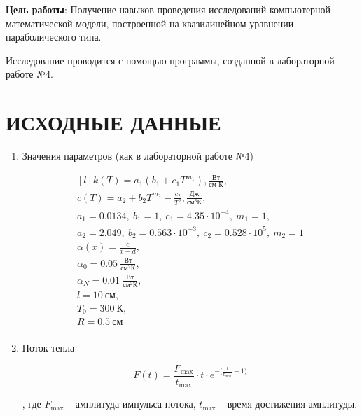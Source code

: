 \textbf{Цель работы}: Получение навыков проведения исследований компьютерной математической модели, построенной на квазилинейном уравнении параболического типа.

Исследование проводится с помощью программы, созданной в лабораторной работе №4.

\section{ИСХОДНЫЕ ДАННЫЕ}

\begin{enumerate}
    \item Значения параметров (как в лабораторной работе №4)

        \begin{equation*}
            \begin{matrix*}[l]
                k(T) = a_1(b_1 + c_1 T^{m_1}), \frac{\text{Вт}}{\text{см К}}, \\
                c(T) = a_2 + b_2 T^{m_2} - \frac{c_2}{T^2}, \frac{\text{Дж}}{\text{см}^3 \text{К}}, \\
                a_1 = 0.0134,\ b_1 = 1,\ c_1 = 4.35 \cdot 10^{-4},\ m_1=1, \\
                a_2 = 2.049,\ b_2 = 0.563 \cdot 10^{-3},\ c_2 = 0.528 \cdot 10^5,\ m_2 = 1 \\
                \alpha(x) = \frac{c}{x-d}, \\
                \alpha_0 = 0.05\ \frac{\text{Вт}}{\text{см}^2 \text{К}}, \\
                \alpha_N = 0.01\ \frac{\text{Вт}}{\text{см}^2 \text{К}}, \\
                l = 10\ \text{см}, \\
                T_0 = 300\ \text{К}, \\
                R = 0.5\ \text{см} \\
            \end{matrix*}
        \end{equation*}


    \item Поток тепла

        \begin{equation*}
            F(t) = \frac{F_\text{max}}{t_\text{max}} \cdot t \cdot e^{-\big(\frac{t}{t_\text{max}} - 1\big)}
        \end{equation*}

        , где $F_\text{max}$ -- амплитуда импульса потока, $t_\text{max}$ -- время достижения амплитуды.
\end{enumerate}

